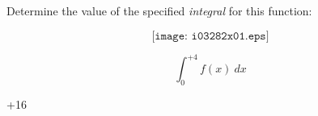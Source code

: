 

Determine the value of the specified {\it integral} for this function:

$$\texttt{[image: i03282x01.eps]}$$

$$\int_{0}^{+4} f(x) \> dx$$







+16












